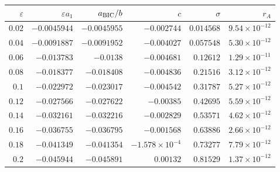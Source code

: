 \begin{tabular}{rrrrrr}
\toprule
$\varepsilon$ & $\varepsilon a_1$ & $a_{\rm BIC}/b$ & $c$ & $\sigma$ & $r_A$ \\
\midrule
$0.02$ & $-0.0045944$ & $-0.0045955$ & $-0.002744$ & $0.014568$ & $9.54\times10^{-12}$ \\
$0.04$ & $-0.0091887$ & $-0.0091952$ & $-0.004027$ & $0.057548$ & $5.30\times10^{-12}$ \\
$0.06$ & $-0.013783$ & $-0.0138$ & $-0.004681$ & $0.12612$ & $1.29\times10^{-11}$ \\
$0.08$ & $-0.018377$ & $-0.018408$ & $-0.004836$ & $0.21516$ & $3.12\times10^{-12}$ \\
$0.1$ & $-0.022972$ & $-0.023017$ & $-0.004542$ & $0.31787$ & $5.27\times10^{-12}$ \\
$0.12$ & $-0.027566$ & $-0.027622$ & $-0.00385$ & $0.42695$ & $5.59\times10^{-12}$ \\
$0.14$ & $-0.032161$ & $-0.032216$ & $-0.002829$ & $0.53571$ & $4.62\times10^{-12}$ \\
$0.16$ & $-0.036755$ & $-0.036795$ & $-0.001568$ & $0.63886$ & $2.66\times10^{-12}$ \\
$0.18$ & $-0.041349$ & $-0.041354$ & $-1.578\times10^{-4}$ & $0.73277$ & $7.79\times10^{-12}$ \\
$0.2$ & $-0.045944$ & $-0.045891$ & $0.00132$ & $0.81529$ & $1.37\times10^{-12}$ \\
\bottomrule
\end{tabular}
